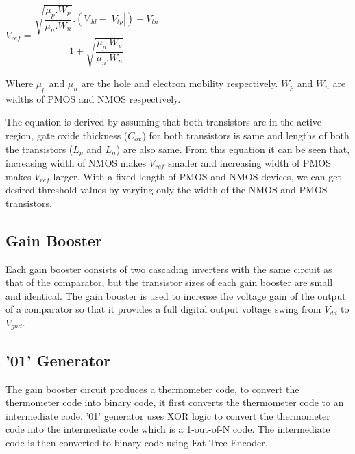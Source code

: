 \begin{center}
$ V_{ref}=\dfrac{{\sqrt{\dfrac{\mu_p.W_p}{\mu_n.W_n}}}.(V_{dd}-|V_{tp}|)+V_{tn}}{1+ \sqrt{\dfrac{\mu_p.W_p}{\mu_n.W_n}}}$
\end{center}
\vspace{2 mm}

	Where $\mu_p$ and $\mu_n$ are the hole and electron mobility respectively. $W_p$ and $W_n$ are widths of PMOS and NMOS respectively. \\

\par
\hspace{0.5cm}The equation is derived by assuming that both transistors are in the active region, gate oxide thickness ($C_{ox}$) for both transistors is same and lengths of both the transistors ($L_p$ and $L_n$) are also same. From this equation it can be seen that, increasing width of NMOS makes $V_{ref}$ smaller and increasing width of PMOS makes $V_{ref}$ larger. With a fixed length of PMOS and NMOS devices, we can get desired threshold values by varying only the width of the NMOS and PMOS transistors.



\subsection{Gain Booster}

\par
\hspace{1.2cm}Each gain booster consists of two cascading inverters with the same circuit as that of the comparator, but the transistor sizes of each gain booster are small and identical. The gain booster is used to increase the voltage gain of the output of a comparator so that it provides a full digital output voltage swing from $V_{dd}$ to $V_{gnd}$.


\subsection{'01' Generator}

\par
\hspace{1.2cm}The gain booster circuit produces a thermometer code, to convert the thermometer code into binary code, it first converts the thermometer code to an intermediate code. '01' generator uses XOR logic to convert the thermometer code into the intermediate code which is a 1-out-of-N code. The intermediate code is then converted to binary code using Fat Tree Encoder.

